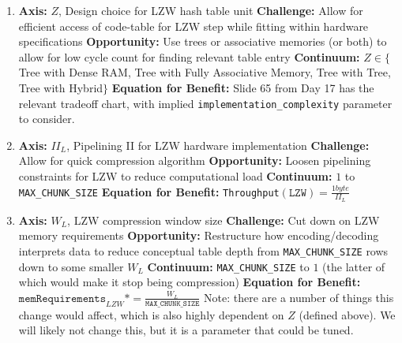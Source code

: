\documentclass{article}
\begin{document}
\begin{enumerate}
\item%

\textbf{Axis:} $Z$, Design choice for LZW hash table unit
\newline
\textbf{Challenge:} Allow for efficient access of code-table for LZW step while fitting within hardware specifications
\newline
\textbf{Opportunity:} Use trees or associative memories (or both) to allow for low cycle count for finding relevant table entry
\newline
\textbf{Continuum:} $Z\in\{$Tree with Dense RAM, Tree with Fully Associative Memory, Tree with Tree, Tree with Hybrid$\}$
\newline
\textbf{Equation for Benefit:} Slide 65 from Day 17 has the relevant tradeoff chart, with implied \texttt{implementation\_complexity} parameter to consider.

\item%

\textbf{Axis:} $II_L$, Pipelining II for LZW hardware implementation
\newline
\textbf{Challenge:} Allow for quick compression algorithm
\newline
\textbf{Opportunity:} Loosen pipelining constraints for LZW to reduce computational load
\newline
\textbf{Continuum:} $1$ to \texttt{MAX\_CHUNK\_SIZE}
\newline
\textbf{Equation for Benefit:} \texttt{Throughput}$\left(\texttt{LZW}\right)=\frac{1 byte}{II_L}$

\item%

\textbf{Axis:} $W_L$, LZW compression window size
\newline
\textbf{Challenge:} Cut down on LZW memory requirements
\newline
\textbf{Opportunity:} Restructure how encoding/decoding interprets data to reduce conceptual table depth from \texttt{MAX\_CHUNK\_SIZE} rows down to some smaller $W_L$
\newline
\textbf{Continuum:} \texttt{MAX\_CHUNK\_SIZE} to $1$ (the latter of which would make it stop being compression)
\newline
\textbf{Equation for Benefit:} $\texttt{memRequirements}_{LZW} *= \frac{W_L}{\texttt{MAX\_CHUNK\_SIZE}}$\newline
Note: there are a number of things this change would affect, which is also highly dependent on $Z$ (defined above). We will likely not change this, but it is a parameter that could be tuned.


\end{enumerate}
\end{document}
